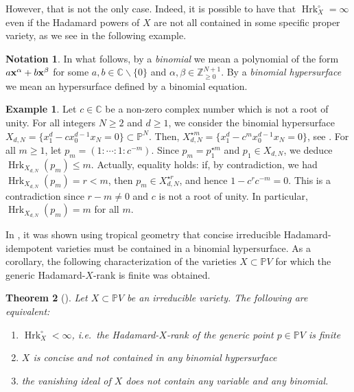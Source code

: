 \documentclass{amsart}
\theoremstyle{plain}
\newtheorem{theorem}{Theorem}
\numberwithin{theorem}{section}
\theoremstyle{definition}
\newtheorem{example}[theorem]{Example}
\newtheorem*{notation}{Notation}
\newcommand{\bbC}{\mathbb{C}}
\newcommand{\bbP}{\mathbb{P}}
\newcommand{\bbZ}{\mathbb{Z}}
\newcommand{\Hrk}{\operatorname{Hrk}}
\begin{document}
However, that is not the only case. Indeed, it is possible to have that $\Hrk_X^\circ = \infty$ even if the Hadamard powers of $X$ are not all contained in some specific proper variety, as we see in the following example.

\begin{notation}
    In what follows, by a {\em binomial} we mean a polynomial of the form $a{\bf x}^{\alpha} + b {\bf x}^\beta$ for some $a, b \in \bbC \smallsetminus\{0\}$ and $\alpha, \beta \in \bbZ_{\geq 0}^{N+1}$. By a {\em binomial hypersurface} we mean an hypersurface defined by a binomial equation.
\end{notation}

\begin{example}
    Let $c \in \bbC$ be a non-zero complex number which is not a root of unity. For all integers $N\geq 2$ and $d \geq 1$, we consider the binomial hypersurface $X_{d,N} = \{  x_1^d - c x_0^{d-1}x_N = 0 \} \subset \bbP^N$. Then, $X_{d,N}^{\star m} = \{ x_1^d - c^m x_0^{d-1}x_N = 0 \}$, see \cite[Proposition 4.5]{bocci2022hadamard}. For all $m\geq 1$, let $p_m = (1:\cdots:1:c^{-m})$. Since $p_m = p_1^{\star m}$ and $p_1 \in X_{d,N}$, we deduce $\Hrk_{X_{d,N}} (p_m) \leq m$. Actually, equality holds: if, by contradiction, we had $\Hrk_{X_{d,N}} (p_m) = r < m$, then $p_m \in X_{d,N}^{\star r}$, and hence $1 - c^rc^{-m} = 0$. This is a contradiction since $r-m \neq 0$ and $c$ is not a root of unity. In particular, $\Hrk_{X_{d,N}}(p_m) = m$ for all $m$.
\end{example}

In \cite{hadamardranks}, it was shown using tropical geometry that concise irreducible Hadamard-idempotent varieties must be contained in a binomial hypersurface. As a corollary, the following characterization of the varieties $X \subset \bbP V$ for which the generic Hadamard-$X$-rank is finite was obtained.

\begin{theorem}[\cite{hadamardranks}]\label{thm:finiteness_generic}
    Let $X \subset \bbP V$ be an irreducible variety. The following are equivalent:
    \begin{enumerate}
        \item $\Hrk_X^\circ < \infty$, i.e.\ the Hadamard-$X$-rank of the generic point $p \in \bbP V$ is finite
        \item $X$ is concise and not contained in any binomial hypersurface
        \item the vanishing ideal of $X$ does not contain any variable and any binomial.
    \end{enumerate}
\end{theorem}
\end{document}
